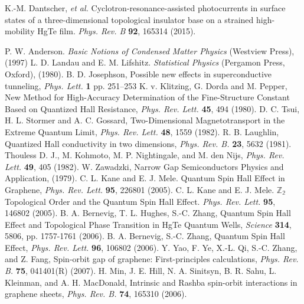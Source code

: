\documentclass[titlepage,a4paper]{book}
\begin{document}
\begin{thebibliography}{199}
K.-M. Dantscher, \textit{et al.} Cyclotron-resonance-assisted photocurrents in surface states of a three-dimensional topological insulator base on a strained high-mobility HgTe film. \textit{Phys. Rev. B} \textbf{92}, 165314 (2015).

P. W. Anderson. \textit{Basic Notions of Condensed Matter Physics} (Westview Press), (1997)
L. D. Landau and E. M. Lifshitz. \textit{Statistical Physics} (Pergamon Press, Oxford), (1980).
B. D. Josephson, Possible new effects in superconductive tunneling, \textit{Phys. Lett.} \textbf{1} pp. 251–253 
K. v. Klitzing, G. Dorda and M. Pepper, New Method for High-Accuracy Determination of the Fine-Structure Constant Based on Quantized Hall Resistance, \textit{Phys. Rev. Lett.} \textbf{45}, 494 (1980).
D. C. Tsui, H. L. Stormer and A. C. Gossard, Two-Dimensional Magnetotransport in the Extreme Quantum Limit, \textit{Phys. Rev. Lett.} \textbf{48}, 1559 (1982).
R. B. Laughlin, Quantized Hall conductivity in two dimensions, \textit{Phys. Rev. B.} \textbf{23}, 5632 (1981).
Thouless D. J., M. Kohmoto, M. P. Nightingale, and M. den Nijs, \textit{Phys. Rev. Lett.} \textbf{49}, 405 (1982).
W. Zawadzki, Narrow Gap Semiconductors Physics and Application, (1979).
C. L. Kane and E. J. Mele. Quantum Spin Hall Effect in Graphene, \textit{Phys. Rev. Lett.} \textbf{95}, 226801 (2005).
C. L. Kane and E. J. Mele. $\mathbb{Z_2}$ Topological Order and the Quantum Spin Hall Effect. \textit{Phys. Rev. Lett.} \textbf{95}, 146802 (2005).
B. A. Bernevig, T. L. Hughes, S.-C. Zhang, Quantum Spin Hall Effect and Topological Phase Transition in HgTe Quantum Wells, \textit{Science} \textbf{314}, 5806, pp. 1757-1761 (2006).
B. A. Bernevig, S.-C. Zhang, Quantum Spin Hall Effect, \textit{Phys. Rev. Lett.} \textbf{96}, 106802 (2006).
Y. Yao, F. Ye, X.-L. Qi, S.-C. Zhang, and Z. Fang, Spin-orbit gap of graphene: First-principles calculations, \textit{Phys. Rev. B.} \textbf{75}, 041401(R) (2007).
H. Min, J. E. Hill, N. A. Sinitsyn, B. R. Sahu, L. Kleinman, and A. H. MacDonald, Intrinsic and Rashba spin-orbit interactions in graphene sheets, \textit{Phys. Rev. B.} \textbf{74}, 165310 (2006).

\end{thebibliography}
\end{document}
